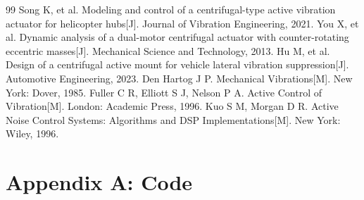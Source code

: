 \documentclass[12pt]{apmcmthesis}
\begin{document}
\begin{thebibliography}{99}
 Song K, et al. Modeling and control of a centrifugal-type active vibration
actuator for helicopter hubs[J]. Journal of Vibration Engineering, 2021.
 You X, et al. Dynamic analysis of a dual-motor centrifugal actuator with
counter-rotating eccentric masses[J]. Mechanical Science and Technology, 2013.
 Hu M, et al. Design of a centrifugal active mount for vehicle lateral vibration
suppression[J]. Automotive Engineering, 2023.
 Den Hartog J P. Mechanical Vibrations[M]. New York: Dover, 1985.
 Fuller C R, Elliott S J, Nelson P A. Active Control of Vibration[M]. London:
Academic Press, 1996.
 Kuo S M, Morgan D R. Active Noise Control Systems: Algorithms and DSP
Implementations[M]. New York: Wiley, 1996.
\end{thebibliography}

\appendix
\section{Appendix A: Code}

\end{document}
